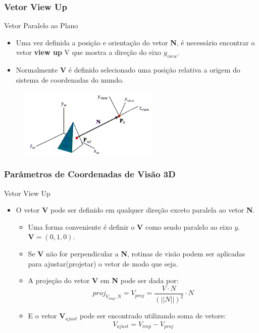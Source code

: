 \documentclass{beamer}
\begin{document}
\begin{frame}
\frametitle{Vetor View Up}
	\begin{block}{Vetor Paralelo ao Plano}
		\begin{itemize}
			\item Uma vez definida a posição e orientação do vetor \textbf{N}, é necessário encontrar o vetor \textbf{view up} V que mostra a direção do eixo $y_{view}$.
			\item Normalmente \textbf{V} é definido selecionado uma posição relativa a origem do sistema de coordenadas do mundo.
		\end{itemize}
	\end{block}
	\begin{figure}[!h]
			\begin{center}
			\includegraphics[width=0.6\textwidth]{Figures/VecN}
			\end{center}
	\end{figure}
\end{frame}

\begin{frame}
\frametitle{Parâmetros de Coordenadas de Visão 3D}
	\begin{block}{Vetor View Up}
		\begin{itemize}
			\item O vetor \textbf{V} pode ser definido em qualquer direção exceto paralela ao vetor \textbf{N}.
			\begin{itemize}
				\item Uma forma conveniente é definir o \textbf{V} como sendo paralelo ao eixo $y$. $\textbf{V}=(0,1,0)$.
				\item Se \textbf{V} não for perpendicular a \textbf{N}, rotinas de visão podem ser aplicadas para ajustar(projetar) o vetor de modo que seja.
				\item A projeção do vetor \textbf{V} em \textbf{N} pode ser dada por:
				\begin{equation*}
					proj_{V_{imp},N} = V_{proj} = \frac{V \cdot N}{(||N||)^2} \cdot N
				\end{equation*}
				\item E o vetor $\textbf{V}_{ajust}$ pode ser encontrado utilizando soma de vetore:
					\begin{equation*}
						V_{ajust} = V_{imp} - V_{proj} 
					\end{equation*}
			\end{itemize}
			
		\end{itemize}
	\end{block}
\end{frame}
\end{document}
